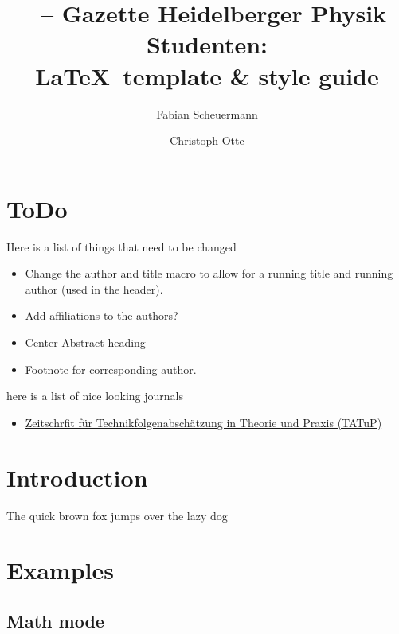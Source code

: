 \documentclass{phoebe}
\title[\LaTeX\ template \& style guide]{\phoebe\ -- Gazette Heidelberger Physik Studenten: \\\LaTeX\ template \& style guide}
\author[F. Scheuermann \& C. Otte]{Fabian Scheuermann \and Christoph Otte}
\begin{document}

\maketitle



\section{ToDo}

Here is a list of things that need to be changed
\begin{itemize}
    \item Change the author and title macro to allow for a running title and running author (used in the header).
    \item Add affiliations to the authors?
    \item Center Abstract heading
    \item Footnote for corresponding author. 
\end{itemize}

here is a list of nice looking journals
\begin{itemize}
    \item \href{https://www.tatup.de/index.php/tatup/issue/view/173/180}{Zeitschrfit für Technikfolgenabschätzung in Theorie und Praxis (TATuP)}
\end{itemize}

\section{Introduction}

The quick brown fox jumps over the lazy dog

\Blindtext

\section{Examples}

\subsection{Math mode}
\end{document}
